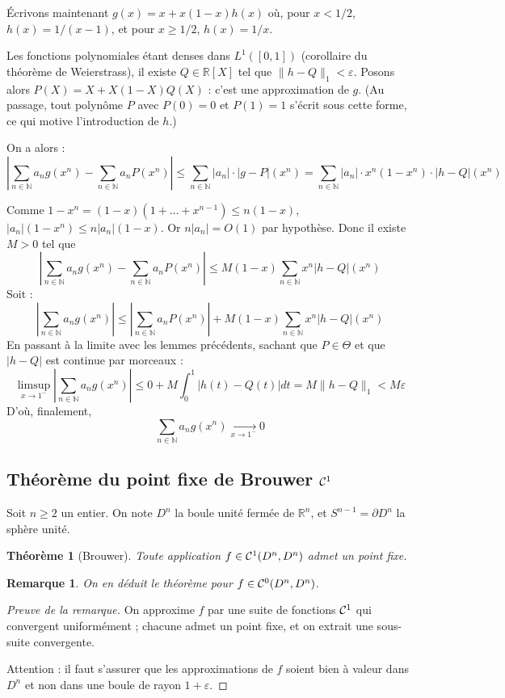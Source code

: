 \documentclass[a4paper, 11pt]{article}
\def\N{\mathbb{N}}
\def\R{\mathbb{R}}
\def\Cf{{\cal{C}}}
\newtheorem*{theorem}{Théorème}
\newtheorem*{remark}{Remarque}
\begin{document}
Écrivons maintenant $g(x) = x + x(1-x)h(x)$ où, pour $x < 1/2$, $h(x) =
1/(x-1)$, et pour $x \geq 1/2$, $h(x) = 1/x$. 

Les fonctions polynomiales étant denses dans $L^1([0,1])$ (corollaire du
théorème de Weierstrass), il existe $Q \in \R[X]$ tel que $\|h-Q\|_1 <
\varepsilon$. Posons alors $P(X) = X + X(1-X)Q(X)$ : c'est une approximation de
$g$. (Au passage, tout polynôme $P$ avec $P(0) = 0$ et $P(1) = 1$ s'écrit sous
cette forme, ce qui motive l'introduction de $h$.)

On a alors :
\[ \left| \sum_{n \in \N} a_n g(x^n) - \sum_{n \in \N} a_n P(x^n) \right| \leq
  \sum_{n \in \N} |a_n| \cdot |g - P|(x^n) = \sum_{n \in \N} |a_n| \cdot
  x^n(1-x^n) \cdot |h - Q|(x^n) \]

Comme $1-x^n = (1-x)(1+ \ldots + x^{n-1}) \leq n(1-x)$, $|a_n|(1-x^n) \leq
n|a_n|(1-x)$. Or $n|a_n| = O(1)$ par hypothèse. Donc il existe $M > 0$ tel que
\[ \left| \sum_{n \in \N} a_n g(x^n) - \sum_{n \in \N} a_n P(x^n) \right| \leq
  M (1-x) \sum_{n \in \N} x^n|h - Q|(x^n) \]
Soit :
\[ \left| \sum_{n \in \N} a_n g(x^n) \right| \leq
  \left| \sum_{n \in \N} a_n P(x^n) \right| +
  M (1-x) \sum_{n \in \N} x^n|h - Q|(x^n) \]
En passant à la limite avec les lemmes précédents, sachant que $P \in \Theta$ et
que $|h-Q|$ est continue par morceaux :
\[ \limsup_{x \to 1^-} \left| \sum_{n \in \N} a_n g(x^n) \right| \leq
  0 + M \int_0^1 |h(t) - Q(t)|dt = M \|h-Q\|_1 < M\varepsilon \]
D'où, finalement,
\[ \sum_{n \in \N} a_n g(x^n) \xrightarrow[x \to 1^-]{} 0 \]

\newpage


\subsection{Théorème du point fixe de Brouwer $\Cf^1$}

Soit $n \geq 2$ un entier. On note $D^n$ la boule unité fermée de $\R^n$, et
$S^{n-1} = \partial D^n$ la sphère unité.

\begin{theorem}[Brouwer]
  Toute application $f \in \Cf^1(D^n, D^n)$ admet un point fixe.
\end{theorem}

\begin{remark}
  On en déduit le théorème pour $f \in \Cf^0(D^n, D^n)$.
\end{remark}
\begin{proof}[Preuve de la remarque]
  On approxime $f$ par une suite de fonctions $\Cf^1$ qui convergent
  uniformément ; chacune admet un point fixe, et on extrait une sous-suite
  convergente.

  Attention : il faut s'assurer que les approximations de $f$ soient bien à
  valeur dans $D^n$ et non dans une boule de rayon $1+\varepsilon$.
\end{proof}
\end{document}
